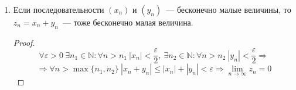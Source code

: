 \begin{enumerate}
	\item Если последовательности $(x_n)$ и $(y_n)$~--- бесконечно малые величины, то $z_n = x_n + y_n$~--- тоже бесконечно малая величина.
	\begin{proof}
	\begin{equation*}
	\forall \varepsilon > 0 \
	\exists n_1 \in \mathbb N \colon \forall n > n_1 \ |x_n| < \frac\varepsilon2, \
	\exists n_2 \in \mathbb N \colon \forall n > n_2 \ |y_n| < \frac\varepsilon2 \Rightarrow
	\end{equation*}
	\begin{equation*}
	\Rightarrow \forall n > \max \{ n_1, n_2 \} \ |x_n + y_n| \leqslant |x_n| + |y_n| < \varepsilon \Rightarrow
	\lim_{n \to \infty} z_n = 0
	\end{equation*}
	\end{proof}
\end{enumerate}
